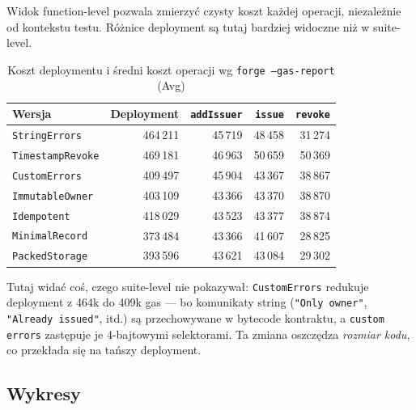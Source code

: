 \documentclass[11pt,a4paper]{article}
\begin{document}
Widok function-level pozwala zmierzyć czysty koszt każdej operacji,
niezależnie od kontekstu testu. Różnice deployment są tutaj
bardziej widoczne niż w suite-level.

\begin{table}[H]
\centering
\caption{Koszt deploymentu i średni koszt operacji wg \texttt{forge --gas-report} (Avg)}
\begin{tabular}{lrrrr}
\toprule
Wersja & Deployment & \texttt{addIssuer} & \texttt{issue} & \texttt{revoke} \\
\midrule
\texttt{StringErrors}    & 464\,211 & 45\,719 & 48\,458 & 31\,274 \\
\rowcolor{regresscolor}
\texttt{TimestampRevoke} & 469\,181 & 46\,963 & 50\,659 & 50\,369 \\
\texttt{CustomErrors}    & 409\,497 & 45\,904 & 43\,367 & 38\,867 \\
\texttt{ImmutableOwner}  & 403\,109 & 43\,366 & 43\,370 & 38\,870 \\
\texttt{Idempotent}      & 418\,029 & 43\,523 & 43\,377 & 38\,874 \\
\rowcolor{bestcolor}
\texttt{MinimalRecord}   & 373\,484 & 43\,366 & 41\,607 & 28\,825 \\
\texttt{PackedStorage}   & 393\,596 & 43\,621 & 43\,084 & 29\,302 \\
\bottomrule
\end{tabular}
\end{table}

\noindent Tutaj widać coś, czego suite-level nie pokazywał:
\texttt{CustomErrors} redukuje deployment z 464k do 409k gas --- bo komunikaty
string (\texttt{"Only owner"}, \texttt{"Already issued"}, itd.)
są przechowywane w bytecode kontraktu,
a \texttt{custom errors} zastępuje je 4-bajtowymi selektorami.
Ta zmiana oszczędza \emph{rozmiar kodu}, co przekłada się na tańszy deployment.

\subsection{Wykresy}
\end{document}

